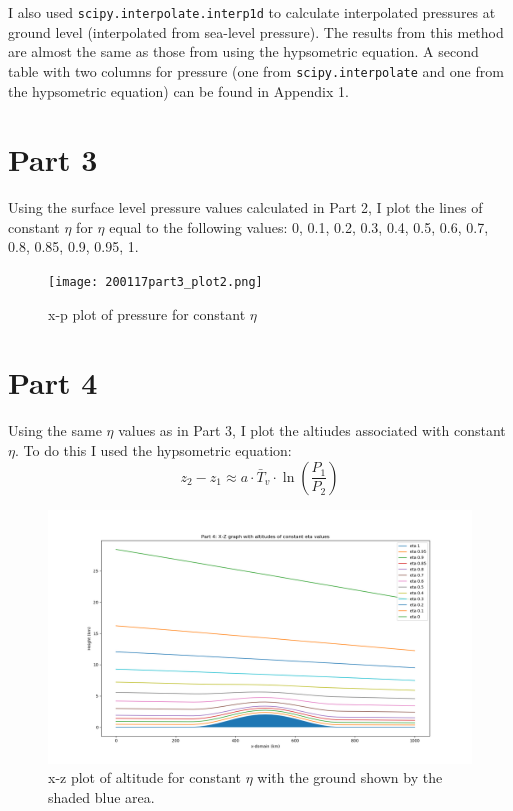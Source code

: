 \documentclass[12pt]{article}
\newcommand{\code}[1]{\texttt{#1}}
\begin{document}
I also used \code{scipy.interpolate.interp1d} to calculate interpolated pressures at ground level 
(interpolated from sea-level pressure). The results from this method are almost the same as those from using the hypsometric
equation. A second table with two columns for pressure (one from \code{scipy.interpolate} and one from the 
hypsometric equation) can be found in Appendix 1.


\section*{Part 3}

Using the surface level pressure values calculated in Part 2, I plot the lines of constant $ \eta $ 
for $ \eta $ equal to the following values: 0, 0.1, 0.2, 0.3, 0.4, 0.5, 0.6, 0.7, 0.8, 0.85, 0.9, 0.95, 1.


\begin{figure}[h]
    \centering
    \texttt{[image: 200117part3\_plot2.png]}
    \caption{x-p plot of pressure for constant $ \eta $}
    \label{fig:mesh1}
\end{figure}


\section*{Part 4}

Using the same $ \eta $ values as in Part 3, I plot the altiudes associated with constant $ \eta $.
To do this I used the hypsometric equation:
$$
z_{2}-z_{1} \approx a \cdot \bar{T}_{v} \cdot \ln \left(\frac{P_{1}}{P_{2}}\right)
$$


\begin{figure}[h]
    \centering
    \includegraphics[width=\textwidth]{NWP200125part4_plot.png}
    \caption{x-z plot of altitude for constant $ \eta $ with the ground shown by the shaded blue area.}
    \label{fig:mesh1}
\end{figure}
\end{document}
